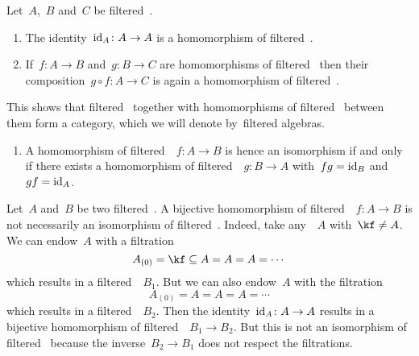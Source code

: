 \begin{remark}
  Let~$A$,~$B$ and~$C$ be filtered~\algebras{$\kf$}.
  \begin{enumerate}
    \item
      The identity~$\id_A \colon A \to A$ is a homomorphism of filtered~\algebras{$\kf$}.
    \item
      If~$f \colon A \to B$ and~$g \colon B \to C$ are homomorphisms of filtered~\algebras{$\kf$} then their composition~$g \circ f \colon A \to C$ is again a homomorphism of filtered~\algebras{$\kf$}.
  \end{enumerate}
  This shows that filtered~\algebras{$\kf$} together with homomorphisms of filtered~\algebras{$\kf$} between them form a category, which we will denote by~\gls*{filtered algebras}.
  \begin{enumerate}[resume]
    \item
      A homomorphism of filtered~{\algebras{$\kf$}}~$f \colon A \to B$ is hence an isomorphism if and only if there exists a homomorphism of filtered~{\algebras{$\kf$}}~$g \colon B \to A$ with~$f {} g = \mathrm{id}_B$ and~$g f = \mathrm{id}_A$.
  \end{enumerate}
\end{remark}


\begin{warning}
  Let~$A$ and~$B$ be two filtered~{\algebras{$\kf$}}.
  A bijective homomorphism of filtered~{\algebras{$\kf$}}~$f \colon A \to B$ is not necessarily an isomorphism of filtered~{\algebras{$\kf$}}.
  Indeed, take any~{\algebra{$\kf$}}~$A$ with~$\kf \neq A$.
  We can endow~$A$ with a filtration
  \[
    A_{(0)}
    =
    \kf
    \subseteq
    A
    =
    A
    =
    A
    =
    \dotsb
  \]
  which results in a filtered~{\algebra{$\kf$}}~$B_1$.
  But we can also endow~$A$ with the filtration
  \[
    A_{(0)}
    =
    A
    =
    A
    =
    A
    =
    \dotsb
  \]
  which results in a filtered~{\algebra{$\kf$}}~$B_2$.
  Then the identity~$\id_A \colon A \to A$  results in a bijective homomorphism of filtered~{\algebras{$\kf$}}~$B_1 \to B_2$.
  But this is not an isomorphism of filtered~{\algebras{$\kf$}} because the inverse~$B_2 \to B_1$ does not respect the filtrations.
\end{warning}


